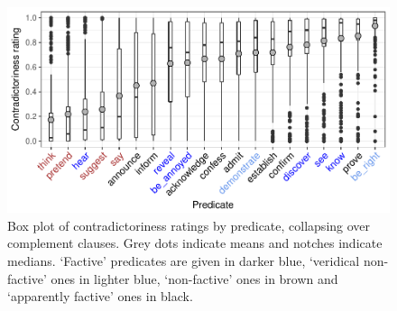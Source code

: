 \documentclass[11pt,fleqn]{article}
\newcommand{\6}{\mbox{$[\hspace*{-.6mm}[$}}
\newcommand{\9}{\mbox{$]\hspace*{-.6mm}]$}}
\begin{document}
{%

\begin{figure}[h!]
\centering

\includegraphics[width=.75\paperwidth]{../results/2-veridicality2/graphs/boxplot-veridicality}

\caption{Box plot of contradictoriness ratings by predicate, collapsing over complement clauses. Grey dots indicate means and notches indicate medians. `Factive' predicates are given in darker blue, `veridical non-factive' ones in lighter blue, `non-factive' ones in brown and `apparently factive' ones in black.}
\label{f-veridicality-predicate}
\end{figure}

}
\end{document}
